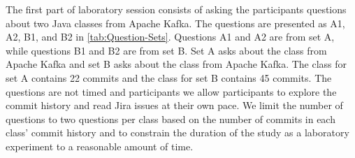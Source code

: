 The first part of laboratory session consists of 
asking the participants questions about two Java classes from Apache Kafka.
The questions are presented as A1, A2, B1, and B2 in \autoref{tab:Question-Sets}.
Questions A1 and A2 are from set A, while questions B1 and B2 are from set B.
Set A asks about the  class from Apache Kafka and 
set B asks about the  class from Apache Kafka.
The  class for set A contains 22 commits and the  class for set B contains 45 commits.
The questions are not timed and participants we allow participants to explore the commit history and read Jira issues at their own pace.
We limit the number of questions to two questions per class based on the number of commits in each class' commit history and 
to constrain the duration of the study as a laboratory experiment to a reasonable amount of time.

